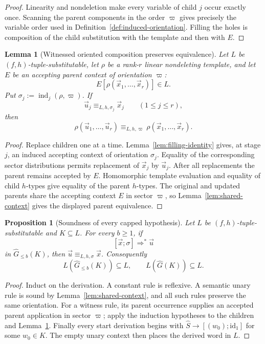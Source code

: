 \documentclass[11pt,a4paper]{article}
\numberwithin{equation}{section}
\theoremstyle{plain}
\newtheorem{lemma}[theorem]{Lemma}
\newtheorem{proposition}[theorem]{Proposition}
\theoremstyle{definition}
\theoremstyle{remark}
\newcommand{\tuple}[1]{\vec{#1}}
\begin{document}
\begin{proof}
Linearity and nondeletion make every variable of child \(j\) occur exactly
once.  Scanning the parent components in the order \(\varpi\) gives precisely the
variable order used in Definition~\ref{def:induced-orientation}.  Filling the
holes is composition of the child substitution with the template and then
with \(E\).
\end{proof}

\begin{lemma}[Witnessed oriented composition preserves equivalence]
\label{lem:witnessed-composition}
Let \(L\) be \((f,h)\)-tuple-substitutable, let \(\rho\) be a rank-\(r\)
linear nondeleting template, and let \(E\) be an accepting parent context of
orientation \(\varpi\):
\[
  E[\rho(\tuple x_1,\ldots,\tuple x_r)]\in L.
\]
Put \(\sigma_j:=\operatorname{ind}_j(\rho,\varpi)\).  If
\[
  \tuple u_j\equiv_{L,h,\sigma_j}\tuple x_j
  \qquad(1\le j\le r),
\]
then
\[
  \rho(\tuple u_1,\ldots,\tuple u_r)
  \equiv_{L,h,\varpi}
  \rho(\tuple x_1,\ldots,\tuple x_r).
\]
\end{lemma}

\begin{proof}
Replace children one at a time.  Lemma~\ref{lem:filling-identity} gives, at
stage \(j\), an induced accepting context of orientation \(\sigma_j\).
Equality of the corresponding sector distributions permits replacement of
\(\tuple x_j\) by \(\tuple u_j\).  After all replacements the parent remains
accepted by \(E\).  Homomorphic template evaluation and equality of child
\(h\)-types give equality of the parent \(h\)-types.  The original and updated
parents share the accepting context \(E\) in sector \(\varpi\), so
Lemma~\ref{lem:shared-context} gives the displayed parent equivalence.
\end{proof}

\begin{proposition}[Soundness of every capped hypothesis]
\label{prop:learner-soundness}
Let \(L\) be \((f,h)\)-tuple-substitutable and \(K\subseteq L\).  For every
\(b\ge1\), if
\[
  [\tuple x;\sigma]\Rightarrow^*\tuple u
\]
in \(\widehat G_{\le b}(K)\), then
\(\tuple u\equiv_{L,h,\sigma}\tuple x\).  Consequently
\[
  L(\widehat G_{\le b}(K))\subseteq L,
  \qquad
  L(\widehat G(K))\subseteq L.
\]
\end{proposition}

\begin{proof}
Induct on the derivation.  A constant rule is reflexive.  A semantic unary
rule is sound by Lemma~\ref{lem:shared-context}, and all such rules preserve
the same orientation.  For a witness rule, its parent occurrence supplies an
accepted parent application in sector \(\varpi\); apply the induction hypotheses
to the children and Lemma~\ref{lem:witnessed-composition}.  Finally every
start derivation begins with \(\widehat S\to[(w_0);\mathrm{id}_1]\) for some
\(w_0\in K\).  The empty unary context then places the derived word in \(L\).
\end{proof}
\end{document}
